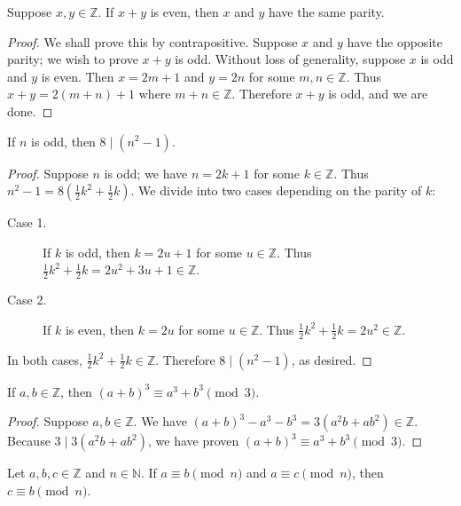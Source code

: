 \documentclass{exam}
\begin{document}
\begin{proposition}{5.16}
    Suppose $x,y\in\mathbb Z$. If $x+y$ is even, then $x$ and $y$ have the same parity.
\end{proposition}

\begin{proof}
    We shall prove this by contrapositive. Suppose $x$ and $y$ have the opposite parity; we wish to prove $x+y$ is odd. Without loss of generality, suppose $x$ is odd and $y$ is even. Then $x = 2m + 1$ and $y = 2n$ for some $m,n\in\mathbb Z$. Thus $x + y = 2(m + n) +1$ where $m+n\in\mathbb Z$. Therefore $x + y$ is odd, and we are done.
\end{proof}

\begin{proposition}{5.17}
    If $n$ is odd, then $8\mid (n^2-1)$.
\end{proposition}

\begin{proof}
    Suppose $n$ is odd; we have $n = 2k + 1$ for some $k\in\mathbb Z$. Thus $n^2 - 1 = 8(\frac12k^2+\frac12k)$. We divide into two cases depending on the parity of $k$:
    \begin{description}
        \item[Case 1. ] If $k$ is odd, then $k = 2u + 1$ for some $u\in\mathbb Z$. Thus $\frac12k^2 + \frac12k = 2u^2+3u+1 \in \mathbb Z$.
        \item[Case 2. ] If $k$ is even, then $k = 2u$ for some $u\in\mathbb Z$. Thus $\frac12k^2 + \frac12k = 2u^2 \in \mathbb Z$.
    \end{description}
    In both cases, $\frac12k^2 + \frac12k\in\mathbb Z$. Therefore $8\mid(n^2-1)$, as desired.
\end{proof}

\begin{proposition}{5.18}
    If $a, b\in\mathbb Z$, then $(a+b)^3 \equiv a^3 + b^3 \pmod 3$.
\end{proposition}

\begin{proof}
    Suppose $a, b\in\mathbb Z$. We have $(a+b)^3 - a^3 - b^3 = 3(a^2b+ab^2)\in\mathbb Z$. Because $3 \mid 3(a^2b + ab^2)$, we have proven $(a+b)^3 \equiv a^3 + b^3 \pmod 3$.
\end{proof}

\begin{proposition}{5.19}
    Let $a, b, c\in\mathbb Z$ and $n\in\mathbb N$. If $a\equiv b\pmod n$ and $a\equiv c \pmod n$, then $c\equiv b\pmod n$.
\end{proposition}
\end{document}
